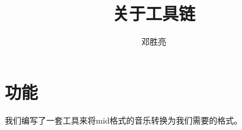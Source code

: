 \documentclass{article}
\title{关于工具链}
\author{邓胜亮}
\begin{document}
  \section{功能}
    我们编写了一套工具来将mid格式的音乐转换为我们需要的格式。
\end{document}

